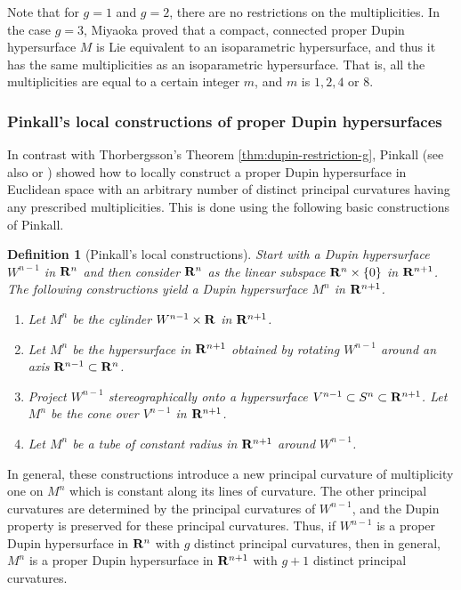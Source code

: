 \documentclass[12pt]{article}
\newtheorem{definition}{Definition}[section]
\begin{document}
{Note that for
$g=1$ and $g=2$, there are no restrictions on the multiplicities. In the case $g=3$,
Miyaoka \cite{Mi1} proved that a compact, connected proper Dupin hypersurface $M$ is 
Lie equivalent to an isoparametric hypersurface, and thus it has the same multiplicities as an isoparametric hypersurface.
That is, all the multiplicities are equal to a certain integer $m$, and $m$ is $1,2,4$ or 8.



\subsubsection*{Pinkall's local constructions of proper Dupin hypersurfaces}


In contrast with Thorbergsson's Theorem \ref{thm:dupin-restriction-g},
Pinkall \cite{P2} (see also \cite[pp. 34--35]{CR8} or \cite[pp. 125--141]{Cec9}) 
showed how to locally construct a proper Dupin hypersurface in Euclidean space with an
arbitrary number of distinct principal curvatures having any
prescribed multiplicities. This is done using the following basic constructions of Pinkall.

\begin{definition}[Pinkall's local constructions]
\label{def:pinkalls-constructions}
Start with a Dupin hypersurface
$W^{n-1}$ in ${\bf R}^n$ and then consider ${\bf R}^n$
as the linear subspace ${\bf R}^n \times \{ 0 \}$
in ${\bf R}^{n+1}$. 
The following 
constructions yield a Dupin hypersurface $M^n$ in
${\bf R}^{n+1}$.
\begin{enumerate}
\item[$(1)$] Let $M^n$ be the cylinder $W^{n-1} \times {\bf R}$ in
${\bf R}^{n+1}$.
\item[$(2)$] Let $M^n$ be the hypersurface in ${\bf R}^{n+1}$
obtained by rotating
$W^{n-1}$ around an axis
${\bf R}^{n-1} \subset {\bf R}^n$.
\item[$(3)$] Project $W^{n-1}$ stereographically onto a hypersurface
$V^{n-1} \subset S^n \subset {\bf R}^{n+1}$.  Let
$M^n$ be the cone over $V^{n-1}$ in ${\bf R}^{n+1}$.
\item[$(4)$] Let $M^n$ be a tube of constant radius in ${\bf R}^{n+1}$ around $W^{n-1}$.
\end{enumerate}
\end{definition}



In general, these constructions introduce a new principal curvature 
of multiplicity one on $M^n$ which is constant along its lines 
of curvature.  The other principal curvatures are determined by the 
principal curvatures of $W^{n-1}$, and the Dupin property is preserved
for these principal curvatures.  Thus, 
if $W^{n-1}$ is a proper Dupin hypersurface in ${\bf R}^n$
with $g$ distinct principal curvatures, then in general, $M^n$ is a 
proper Dupin hypersurface in ${\bf R}^{n+1}$ with $g+1$ distinct principal curvatures.

}
\end{document}
